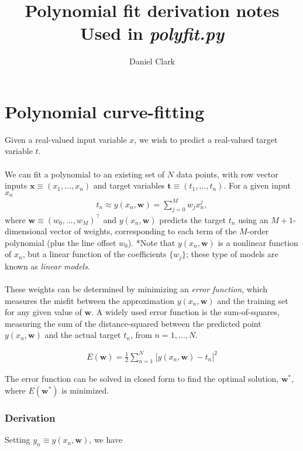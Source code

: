 \documentclass{article}
\title{Polynomial fit derivation notes\\
Used in \emph{polyfit.py}}
\author{Daniel Clark}
\begin{document}
\maketitle

\section*{Polynomial curve-fitting}
Given a real-valued input variable $x$, we wish to predict a real-valued target variable $t$.
\\\\
We can fit a polynomial to an existing set of $N$ data points, with row vector inputs $\bm{x} \equiv (x_1, ..., x_n)$ and target variables $\bm{t} \equiv (t_1, ..., t_n) $. For a given input $x_n$
\begin{align}
    t_n \approx y(x_n, \mathbf{w}) = \sum_{j=0}^M w_j x_n^j,
\end{align}
where $\mathbf{w} \equiv (w_0, ..., w_M)^\top$ and $y(x_n, \mathbf{w})$ predicts the target $t_n$ using an $M+1$-dimensional vector of weights, corresponding to each term of the $M$-order polynomial (plus the line offset $w_0$). *Note that $y(x_n, \mathbf{w})$ is a nonlinear function of $x_n$, but a linear function of the coefficients $\{w_j\}$; these type of models are known as \emph{linear models}.
\\\\
These weights can be determined by minimizing an \emph{error function}, which measures the misfit between the approximation $y(x_n, \mathbf{w})$ and the training set for any given value of $\mathbf{w}$. A widely used error function is the sum-of-squares, measuring the sum of the distance-squared between the predicted point $y(x_n, \mathbf{w})$ and the actual target $t_n$, from $n=1, ..., N$.

\begin{align}
    E(\mathbf{w}) = \frac{1}{2}\sum_{n=1}^N \hspace{1pt}\big[y(x_n, \mathbf{w}) - t_n\big]^2
\end{align}

The error function can be solved in closed form to find the optimal solution, $\mathbf{w}^*$, where $E(\mathbf{w}^*)$ is minimized.
\subsubsection*{Derivation}
Setting $y_n \equiv y(x_n, \mathbf{w})$, we have
\end{document}
